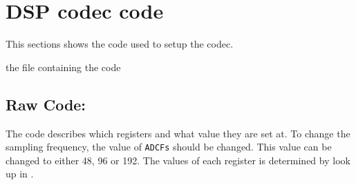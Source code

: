 \section{DSP codec code}\label{sec:codecsetup}

This sections shows the code used to setup the codec.

the file containing the code  

\subsection{Raw Code:}

The code describes which registers and what value they are set at. To change the sampling frequency, the value of \verb|ADCFs| should be changed. This value can be changed to either 48, 96 or 192. The values of each register is determined by look up in .


